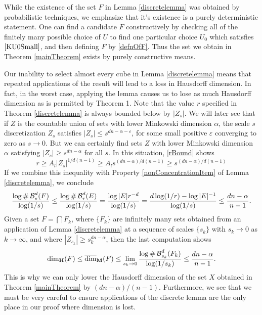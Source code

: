 \begin{remark}
	While the existence of the set $F$ in Lemma \ref{discretelemma} was obtained by probabilistic techniques, we emphasize that it's existence is a purely deterministic statement. One can find a candidate $F$ constructively by checking all of the finitely many possible choice of $U$ to find one particular choice $U_0$ which satisfies $\eqref{KU0Small}$, and then defining $F$ by \eqref{defnOfF}.
	Thus the set we obtain in Theorem \ref{mainTheorem} exists by purely constructive means.
\end{remark}

Our inability to select almost every cube in Lemma \ref{discretelemma} means that repeated applications of the result will lead to a loss in Hausdorff dimension. In fact, in the worst case, applying the lemma causes us to lose as much Hausdorff dimension as is permitted by Theorem 1. Note that the value $r$ specified in Theorem \ref{discretelemma} is always bounded below by $|Z_s|$. We will later see that if $Z$ is the countable union of sets with lower Minkowski dimension $\alpha$, the scale $s$ discretization $Z_s$ satisfies $|Z_s| \leq s^{dn - \alpha - \varepsilon}$, for some small positive $\varepsilon$ converging to zero as $s \to 0$. But we can certainly find sets $Z$ with lower Minkowski dimension $\alpha$ satisfying $|Z_s| \geq s^{dn - \alpha}$ for all $s$. In this situation, \eqref{rBound} shows
%
\begin{equation} \label{rWorstCase}
	r \geq A_l |Z_s|^{1/d(n-1)} \geq A_l s^{(dn - \alpha)/d(n-1)} \geq s^{(dn - \alpha)/d(n-1)}
\end{equation}
%
If we combine this inequality with Property \ref{nonConcentrationItem} of Lemma \ref{discretelemma}, we conclude
%
\[	\frac{\log \# \operatorname{\mathcal{B}}^d_s(F)}{\log(1/s)} \leq \frac{\log \# \operatorname{\mathcal{B}}^d_r(E)}{\log(1/s)} = \frac{\log |E| r^{-d}}{\log(1/s)} = \frac{d \log(1/r) - \log |E|^{-1}}{\log(1/s)} \leq \frac{dn - \alpha}{n - 1}. \]
%
Given a set $F = \bigcap F_k$, where $\{ F_k \}$ are infinitely many sets obtained from an application of Lemma \ref{discretelemma} at a sequence of scales $\{ s_k \}$ with $s_k \to 0$ as $k \to \infty$, and where $|Z_{s_k}| \geq s_k^{dn - \alpha}$, then the last computation shows%
%
\[	\operatorname{\dim_{\mathbf{H}}}(F) \leq \operatorname{\overline{\dim}_{\mathbf{M}}}(F) \leq \lim_{s_k \to 0} \frac{\log \# \operatorname{\mathcal{B}}^d_{s_k}(F_k)}{\log(1/s_k)} \leq \frac{dn - \alpha}{n-1}. \]
%
This is why we can only lower the Hausdorff dimension of the set $X$ obtained in Theorem \ref{mainTheorem} by $(dn - \alpha)/(n-1)$. Furthermore, we see that we must be very careful to ensure applications of the discrete lemma are the only place in our proof where dimension is lost.

